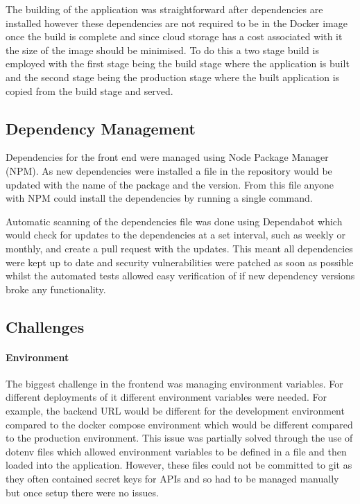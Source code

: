 The building of the application was straightforward after dependencies are installed however these dependencies are not required to be in the Docker image once the build is complete and since cloud storage has a cost associated with it the size of the image should be minimised. To do this a two stage build is employed with the first stage being the build stage where the application is built and the second stage being the production stage where the built application is copied from the build stage and served.

\subsection{Dependency Management}
Dependencies for the front end were managed using Node Package Manager (NPM). As new dependencies were installed a file in the repository would be updated with the name of the package and the version. From this file anyone with NPM could install the dependencies by running a single command.

Automatic scanning of the dependencies file was done using Dependabot which would check for updates to the dependencies at a set interval, such as weekly or monthly, and create a pull request with the updates. This meant all dependencies were kept up to date and security vulnerabilities were patched as soon as possible whilst the automated tests allowed easy verification of if new dependency versions broke any functionality.

\subsection{Challenges}
\paragraph{Environment}
The biggest challenge in the frontend was managing environment variables. For different deployments of it different environment variables were needed. For example, the backend URL would be different for the development environment compared to the docker compose environment which would be different compared to the production environment. This issue was partially solved through the use of dotenv files which allowed environment variables to be defined in a file and then loaded into the application. However, these files could not be committed to git as they often contained secret keys for APIs and so had to be managed manually but once setup there were no issues.

